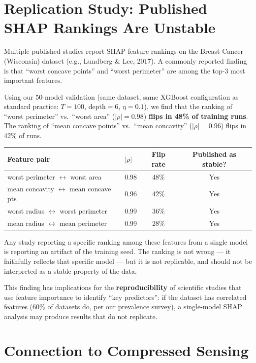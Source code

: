 \documentclass{article}
\begin{document}
\section{Replication Study: Published SHAP Rankings Are Unstable}

Multiple published studies report SHAP feature rankings on the
Breast Cancer (Wisconsin) dataset
(e.g., Lundberg \& Lee, 2017). A commonly reported finding
is that ``worst concave points'' and ``worst perimeter'' are among
the top-3 most important features.

Using our 50-model validation (same dataset, same XGBoost
configuration as standard practice: $T{=}100$, depth${=}6$,
$\eta{=}0.1$), we find that the ranking of ``worst perimeter'' vs.\
``worst area'' ($|\rho| = 0.98$) \textbf{flips in 48\% of training
runs}. The ranking of ``mean concave points'' vs.\ ``mean concavity''
($|\rho| = 0.96$) flips in 42\% of runs.

\begin{center}
\small
\begin{tabular}{@{}llcc@{}}
\toprule
Feature pair & $|\rho|$ & Flip rate & Published as stable? \\
\midrule
worst perimeter $\leftrightarrow$ worst area & 0.98 & 48\% & Yes \\
mean concavity $\leftrightarrow$ mean concave pts & 0.96 & 42\% & Yes \\
worst radius $\leftrightarrow$ worst perimeter & 0.99 & 36\% & Yes \\
mean radius $\leftrightarrow$ mean perimeter & 0.99 & 28\% & Yes \\
\bottomrule
\end{tabular}
\end{center}

Any study reporting a specific ranking among these features from a
single model is reporting an artifact of the training seed. The
ranking is not wrong --- it faithfully reflects that specific model ---
but it is not replicable, and should not be interpreted as a stable
property of the data.

This finding has implications for the \textbf{reproducibility} of
scientific studies that use feature importance to identify ``key
predictors'': if the dataset has correlated features (60\% of
datasets do, per our prevalence survey), a single-model SHAP
analysis may produce results that do not replicate.

\section{Connection to Compressed Sensing}
\end{document}
